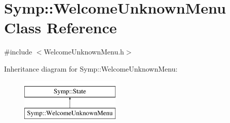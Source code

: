 \hypertarget{class_symp_1_1_welcome_unknown_menu}{\section{Symp\-:\-:Welcome\-Unknown\-Menu Class Reference}
\label{class_symp_1_1_welcome_unknown_menu}
}


{\ttfamily \#include $<$Welcome\-Unknown\-Menu.\-h$>$}

Inheritance diagram for Symp\-:\-:Welcome\-Unknown\-Menu\-:\begin{figure}[H]
\begin{center}
\leavevmode
\includegraphics[height=2.000000cm]{class_symp_1_1_welcome_unknown_menu}
\end{center}
\end{figure}
